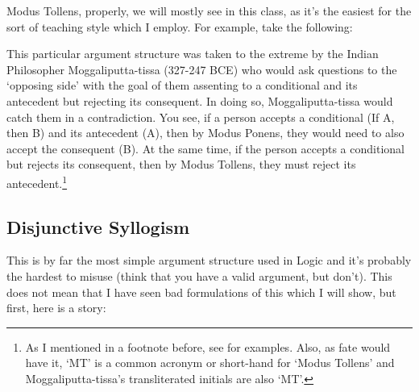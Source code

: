 Modus Tollens, properly, we will mostly see in this class, as it's the easiest for the sort of teaching style which I employ. For example, take the following:

    
This particular argument structure was taken to the extreme by the Indian Philosopher Moggaliputta-tissa (327-247 BCE) who would ask questions to the `opposing side' with the goal of them assenting to a conditional and its antecedent but rejecting its consequent. In doing so, Moggaliputta-tissa would catch them in a contradiction. You see, if a person accepts a conditional (If A, then B) and its antecedent (A), then by Modus Ponens, they would need to also accept the consequent (B). At the same time, if the person accepts a conditional but rejects its consequent, then by Modus Tollens, they must reject its antecedent.\footnote{As I mentioned in a footnote before, see  for examples. Also, as fate would have it, `MT' is a common acronym or short-hand for `Modus Tollens' and Moggaliputta-tissa's transliterated initials are also `MT'.}    
\subsection{Disjunctive Syllogism}
\label{s:p1.3.3}

This is by far the most simple argument structure used in Logic and it's probably the hardest to misuse (think that you have a valid argument, but don't). This does not mean that I have seen bad formulations of this which I will show, but first, here is a story:

